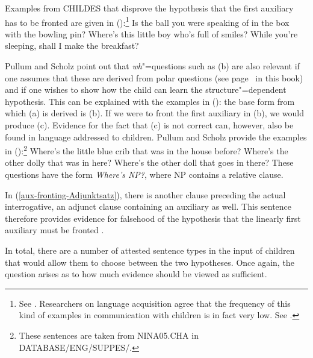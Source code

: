 Examples from CHILDES that disprove the hypothesis that the first auxiliary has to be fronted are given in ():\footnote{ 
  See . Researchers on language acquisition agree that the frequency of this kind of examples in communication with children is in fact
  very low. See .
}
\eal
\label{aux-fronting-childes}
\ex Is the ball you were speaking of in the box with the bowling pin?
\ex Where's this little boy who's full of smiles?
\ex\label{aux-fronting-Adjunktsatz} While you're sleeping, shall I make the breakfast?
\zl

\noindent
Pullum and Scholz point out that \emph{wh}"=questions such as (b) are also relevant if one assumes that these are derived from
polar questions (see page~\pageref{Seite-GB-Entscheidungsfragen-Englisch} in this book) and if one wishes to show how the child can
learn the structure"=dependent hypothesis. This can be explained with the examples in (): the
base form from which (a) is derived is (b). If we were to front the first auxiliary in (b), we would produce (c).
\eal
{}
\zl
Evidence for the fact that (c) is not correct can, however, also be found in language addressed to children.
Pullum and Scholz provide the examples in ():\footnote{
	These sentences are taken from NINA05.CHA in DATABASE/ENG/SUPPES/.
}
\eal
\label{wh-Fragen-Hilfsverbinversion}
\ex Where's the little blue crib that was in the house before?
\ex Where's the other dolly that was in here?
\ex Where's the other doll that goes in there?
\zl
These questions have the form \emph{Where's NP?}, where NP contains a relative clause.

In (\ref{aux-fronting-Adjunktsatz}), there is another clause preceding the actual interrogative, an adjunct clause containing an
auxiliary as well. This sentence therefore provides evidence for falsehood of the hypothesis that the linearly first auxiliary must be fronted
\citep[]{Sampson89a}. 

In total, there are a number of attested sentence types in the input of children that would allow them to choose between the two
hypotheses. Once again, the question arises as to how much evidence should be viewed as sufficient.

